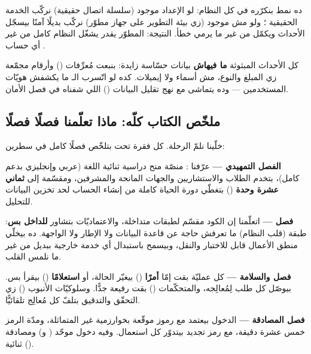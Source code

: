 ده نمط بنكرّره في كل النظام: لو الإعداد موجود (سلسلة اتصال حقيقية) نركّب الخدمة
الحقيقية ؛ ولو مش موجود (زي بيئة التطوير على جهاز مطوّر)
نركّب بديلًا آمنًا  بيسجّل الأحداث ويكمّل من غير ما يرمي
خطأ. النتيجة: المطوّر يقدر يشغّل النظام كامل من غير أي حساب .

\begin{secnote}
كل الأحداث المبثوثة \textbf{ما فيهاش} بيانات حسّاسة زايدة: بنبعت مُعرِّفات
() وأرقام مجمّعة زي المبلغ والنوع، مش أسماء ولا إيميلات. كده لو اتّسرب
الـ ما يكشفش هويّات المستخدمين — وده يتماشى مع نهج تقليل البيانات
() اللي شفناه في فصل الأمان.
\end{secnote}

\subsection{ملخّص الكتاب كلّه: ماذا تعلّمنا فصلًا فصلًا}

خلّينا نلمّ الرحلة. كل فقرة تحت بتلخّص فصلًا كامل في سطرين:

\textbf{الفصل التمهيدي —} عرّفنا : منصّة منح دراسية ثنائية اللغة
(عربي وإنجليزي بدعم  كامل)، بتخدم الطلاب والاستشاريين والجهات المانحة
والمشرفين، ومقسّمة إلى \textbf{ثماني عشرة وحدة} () بتغطّي دورة
الحياة كاملة من إنشاء الحساب لحد تخزين البيانات للتحليل.

\textbf{فصل  —} اتعلّمنا إن الكود مقسّم لطبقات متداخلة،
والاعتماديّات بتشاور \textbf{للداخل بس}: طبقة  (قلب النظام) ما تعرفش
حاجة عن قاعدة البيانات ولا الإطار ولا الواجهة. ده بيخلّي منطق الأعمال قابل
للاختبار والنقل، وبيسمح باستبدال أي خدمة خارجية ببديل من غير ما نلمس القلب.

\textbf{فصل  والسلامة —} كل عمليّة بقت إمّا \textbf{أمرًا} ()
بيغيّر الحالة، أو \textbf{استعلامًا} () بيقرأ بس.  بيوصّل
كل طلب لِمُعالِجه، والمتحكّمات () بقت رفيعة جدًّا. وسلوكيّات
الأنبوب () زي التحقّق والتدقيق بتلفّ كل مُعالِج تلقائيًّا.

\textbf{فصل المصادقة —} الدخول بيعتمد  مع رموز
 موقّعة بخوارزمية  غير المتماثلة، ومدّة الرمز خمس عشرة دقيقة،
مع رمز تجديد بيتدوّر كل استعمال. وفيه دخول موحّد ( و)
ومصادقة ثنائية ().

